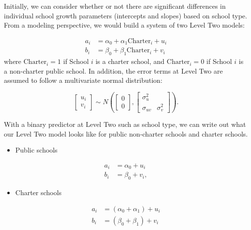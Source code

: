 \documentclass[
]{krantz}
\providecommand{\tightlist}{%
  \setlength{\itemsep}{0pt}\setlength{\parskip}{0pt}}
\begin{document}
Initially, we can consider whether or not there are significant differences in individual school growth parameters (intercepts and slopes) based on school type. From a modeling perspective, we would build a system of two Level Two models:

\begin{align*}
a_{i} & = \alpha_{0} + \alpha_{1}\textrm{Charter}_i + u_{i} \\
b_{i} & = \beta_{0} + \beta_{1}\textrm{Charter}_i + v_{i}
\end{align*}
where \(\textrm{Charter}_i=1\) if School \(i\) is a charter school, and \(\textrm{Charter}_i=0\) if School \(i\) is a non-charter public school. In addition, the error terms at Level Two are assumed to follow a multivariate normal distribution:

\[ \left[ \begin{array}{c}
            u_{i} \\ v_{i}
          \end{array}  \right] \sim N \left( \left[
          \begin{array}{c}
            0 \\ 0
          \end{array} \right], \left[
          \begin{array}{cc}
            \sigma_{u}^{2} & \\
            \sigma_{uv} & \sigma_{v}^{2}
          \end{array} \right] \right) . \]

With a binary predictor at Level Two such as school type, we can write out what our Level Two model looks like for public non-charter schools and charter schools.

\begin{itemize}
\tightlist
\item
  Public schools
\end{itemize}

\begin{align*}
a_{i} & = \alpha_{0} + u_{i}\\
b_{i} & = \beta_{0} + v_{i},
\end{align*}

\begin{itemize}
\tightlist
\item
  Charter schools
\end{itemize}

\begin{align*}
a_{i} & = (\alpha_{0} + \alpha_{1}) + u_{i}\\
b_{i} & = (\beta_{0}+ \beta_{1}) + v_{i}
\end{align*}
\end{document}
